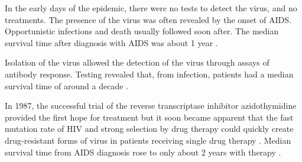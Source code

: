 \documentclass[../sherrill-Mix_thesis.tex]{subfiles}
\begin{document}
	





	In the early days of the epidemic, there were no tests to detect the virus, and no treatments.  The presence of the virus was often revealed by the onset of AIDS. Opportunistic infections \citep{Moore1996} and death usually followed soon after. The median survival time after diagnosis with AIDS was about 1 year \citep{Rothenberg1987,Vella1992}. 

	Isolation of the virus allowed the detection of the virus through assays of antibody response. Testing revealed that, from infection, patients had a median survival time of around a decade \citep{Lui1986,Deschamps2000,Harrison2010,CGAIDSIHIVS2000}. %
	
	In 1987, the successful trial of the reverse transcriptase inhibitor azidothymidine provided the first hope for treatment \citep{Fischl1987,Fischl1989,Volberding1990} but it soon became apparent that the fast mutation rate of HIV \citep{Hahn1986,Preston1988,Roberts1988,Mansky1995,Mansky1996,Abram2010,Achuthan2014} and strong selection by drug therapy could quickly create drug-resistant forms of virus in patients receiving single drug therapy \citep{Larder1989,Larder1989a,Land1990,Boucher1990,Richman1990,Richman1991,Fitzgibbon1992,Richman1994,Schuurman1995,Schmit1996}. Median survival time from AIDS diagnosis rose to only about 2 years with therapy \citep{Creagh-Kirk1988,Fischl1989,Moore1992,Vella1992}. 
	
\end{document}
